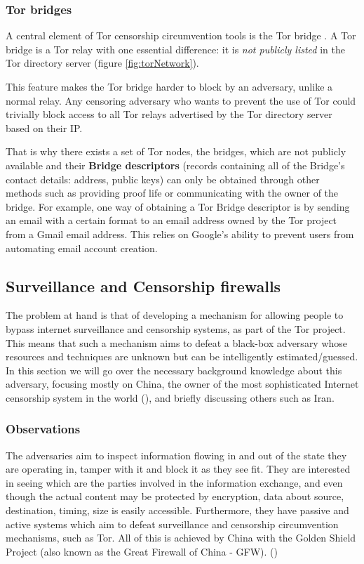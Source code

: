 \documentclass[11pt]{book} %
\begin{document}
\subsubsection{Tor bridges}

A central element of Tor censorship circumvention tools is the Tor bridge \citep*{web:torBridges}. A Tor bridge is a Tor relay with one essential difference: it is \textit{not publicly listed} in the Tor directory server (figure \ref{fig:torNetwork}). 

This feature makes the Tor bridge harder to block by an adversary, unlike a normal relay. Any censoring adversary who wants to prevent the use of Tor could trivially block access to all Tor relays advertised by the Tor directory server based on their IP.

That is why there exists a set of Tor nodes, the bridges, which are not publicly available and their \textbf{Bridge descriptors} (records containing all of the Bridge's contact details: address, public keys) can only be obtained through other methods such as providing proof life or communicating with the owner of the bridge. For example, one way of obtaining a Tor Bridge descriptor is by sending an email with a certain format to an email address owned by the Tor project from a Gmail email address. This relies on Google's ability to prevent users from automating email account creation.


\subsection{Surveillance and Censorship firewalls}

The problem at hand is that of developing a mechanism for allowing people to bypass internet surveillance and censorship systems, as part of  the Tor project. This means that such a mechanism aims to defeat a black-box adversary whose resources and techniques are unknown but can be intelligently estimated/guessed. In this section we will go over the necessary background knowledge about this adversary, focusing mostly on China, the owner of the most sophisticated Internet censorship system in the world (\citep*{web:openNet}), and briefly discussing others such as Iran.

\subsubsection{Observations}

The adversaries aim to inspect information flowing in and out of the state they are operating in, tamper with it and block it as they see fit. They are interested in seeing which are the parties involved in the information exchange, and even though the actual content may be protected by encryption, data about source, destination, timing, size is easily accessible. Furthermore, they have passive and active systems which aim to defeat surveillance and censorship circumvention mechanisms, such as Tor. All of this is achieved by China with the Golden Shield Project (also known as the Great Firewall of China - GFW). (\citep*{web:hikingGFW})
\end{document}
